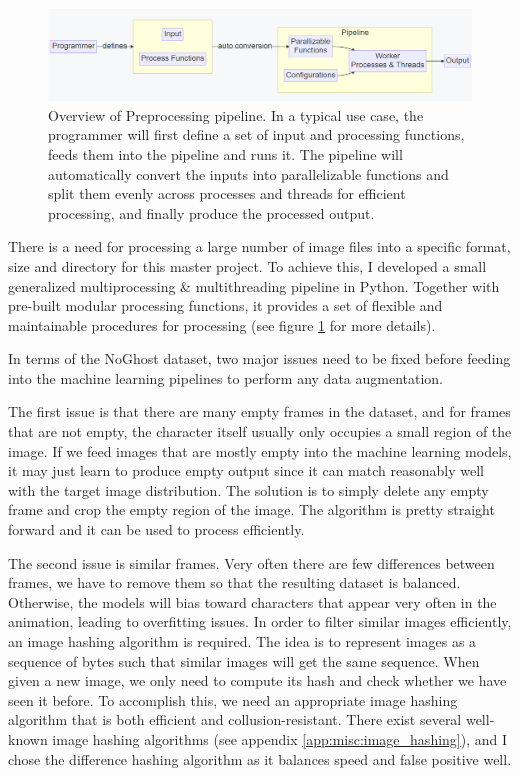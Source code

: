 \begin{figure}
    \centering
    \includegraphics[width=1.0\textwidth]{images/introduction/preprocess_pipeline.png}
    \caption{Overview of Preprocessing pipeline. In a typical use case, the programmer will first define a set of input and processing functions, feeds them into the pipeline and runs it. The pipeline will automatically convert the inputs into parallelizable functions and split them evenly across processes and threads for efficient processing, and finally produce the processed output.} 
    \label{fig:preprocess_pipeline}
\end{figure}

There is a need for processing a large number of image files into a specific format, size and directory for this master project. To achieve this, I developed a small generalized multiprocessing \& multithreading pipeline in Python\cite{WelcomePythonOrg}. Together with pre-built modular processing functions, it provides a set of flexible and maintainable procedures for processing (see figure \ref{fig:preprocess_pipeline} for more details).

In terms of the NoGhost dataset, two major issues need to be fixed before feeding into the machine learning pipelines to perform any data augmentation. 

The first issue is that there are many empty frames in the dataset, and for frames that are not empty, the character itself usually only occupies a small region of the image. If we feed images that are mostly empty into the machine learning models, it may just learn to produce empty output since it can match reasonably well with the target image distribution. The solution is to simply delete any empty frame and crop the empty region of the image. The algorithm is pretty straight forward and it can be used to process efficiently.

The second issue is similar frames. Very often there are few differences between frames, we have to remove them so that the resulting dataset is balanced. Otherwise, the models will bias toward characters that appear very often in the animation, leading to overfitting issues. In order to filter similar images efficiently, an image hashing algorithm is required. The idea is to represent images as a sequence of bytes such that similar images will get the same sequence. When given a new image, we only need to compute its hash and check whether we have seen it before. To accomplish this, we need an appropriate image hashing algorithm that is both efficient and collusion-resistant. There exist several well-known image hashing algorithms (see appendix \ref{app:misc:image_hashing}), and I chose the difference hashing algorithm as it balances speed and false positive well.

